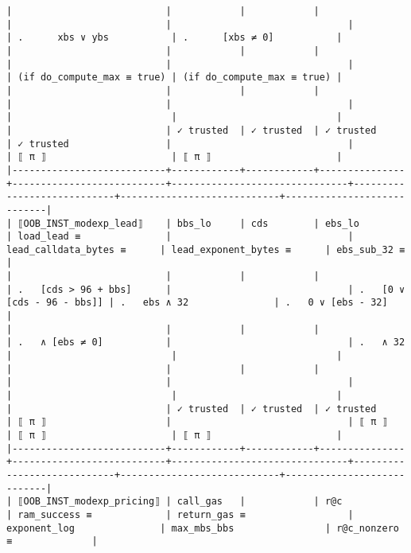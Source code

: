\documentclass[varwidth=\maxdimen,margin=0.5cm,multi={verbatim}]{standalone}
\begin{document}
\begin{verbatim}
|                           |            |            |               |                           |                               |                            | .      xbs ∨ ybs           | .      [xbs ≠ 0]           |
|                           |            |            |               |                           |                               |                            | (if do_compute_max ≡ true) | (if do_compute_max ≡ true) |
|                           |            |            |               |                           |                               |                            |                            |                            |
|                           | ✓ trusted  | ✓ trusted  | ✓ trusted     | ✓ trusted                 |                               |                            | ⟦ π ⟧                      | ⟦ π ⟧                      |
|---------------------------+------------+------------+---------------+---------------------------+-------------------------------+----------------------------+----------------------------+----------------------------|
| ⟦OOB_INST_modexp_lead⟧    | bbs_lo     | cds        | ebs_lo        | load_lead ≡               |                               | lead_calldata_bytes ≡      | lead_exponent_bytes ≡      | ebs_sub_32 ≡               |
|                           |            |            |               | .   [cds > 96 + bbs]      |                               | .   [0 ∨ [cds - 96 - bbs]] | .   ebs ∧ 32               | .   0 ∨ [ebs - 32]         |
|                           |            |            |               | .   ∧ [ebs ≠ 0]           |                               | .   ∧ 32                   |                            |                            |
|                           |            |            |               |                           |                               |                            |                            |                            |
|                           | ✓ trusted  | ✓ trusted  | ✓ trusted     | ⟦ π ⟧                     |                               | ⟦ π ⟧                      | ⟦ π ⟧                      | ⟦ π ⟧                      |
|---------------------------+------------+------------+---------------+---------------------------+-------------------------------+----------------------------+----------------------------+----------------------------|
| ⟦OOB_INST_modexp_pricing⟧ | call_gas   |            | r@c           | ram_success ≡             | return_gas ≡                  | exponent_log               | max_mbs_bbs                | r@c_nonzero ≡              |

\end{verbatim}
\end{document}
